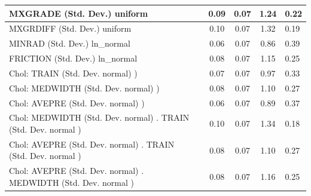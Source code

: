 \begin{table}
\begin{center}
\begin{tabular}{|l|l|c|c|c|l|}
			\hline
			MXGRADE (Std. Dev.) uniform &  & 0.09 & 0.07 & 1.24 & 0.22 \\
			\hline
			MXGRDIFF (Std. Dev.) uniform &  & 0.10 & 0.07 & 1.32 & 0.19 \\
			\hline
			MINRAD (Std. Dev.) ln_normal &  & 0.06 & 0.07 & 0.86 & 0.39 \\
			\hline
			FRICTION (Std. Dev.) ln_normal &  & 0.08 & 0.07 & 1.15 & 0.25 \\
			\hline
			 Chol: TRAIN (Std. Dev. normal) ) &  & 0.07 & 0.07 & 0.97 & 0.33 \\
			\hline
			 Chol: MEDWIDTH (Std. Dev. normal) ) &  & 0.08 & 0.07 & 1.10 & 0.27 \\
			\hline
			 Chol: AVEPRE (Std. Dev. normal) ) &  & 0.06 & 0.07 & 0.89 & 0.37 \\
			\hline
			 Chol: MEDWIDTH (Std. Dev. normal) . TRAIN (Std. Dev.   normal ) &  & 0.10 & 0.07 & 1.34 & 0.18 \\
			\hline
			 Chol: AVEPRE (Std. Dev. normal) . TRAIN (Std. Dev.   normal ) &  & 0.08 & 0.07 & 1.10 & 0.27 \\
			\hline
			 Chol: AVEPRE (Std. Dev. normal) . MEDWIDTH (Std. Dev.   normal ) &  & 0.08 & 0.07 & 1.16 & 0.25 \\
			\hline
		\end{tabular}
	\end{center}
\end{table}